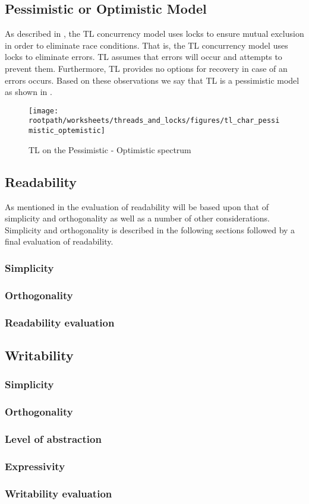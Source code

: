 \subsection{Pessimistic or Optimistic Model}
As described in , the \ac{TL} concurrency model uses locks to ensure mutual exclusion in order to eliminate race conditions. That is, the \ac{TL} concurrency model uses locks to eliminate errors. \ac{TL} assumes that errors will occur and attempts to prevent them. Furthermore, \ac{TL} provides no options for recovery in case of an errors occurs. Based on these observations we say that \ac{TL} is a pessimistic model as shown in .

\begin{figure}[htbp]
\centering
 \texttt{[image: \\rootpath/worksheets/threads\_and\_locks/figures/tl\_char\_pessimistic\_optemistic]} 
 \caption{\ac{TL} on the Pessimistic - Optimistic spectrum}
\label{fig:char_pes_opti}
\end{figure}

\subsection{Readability}
As mentioned in  the evaluation of readability will be based upon that of simplicity and orthogonality as well as a number of other considerations. Simplicity and orthogonality is described in the following sections followed by a final evaluation of readability.
\subsubsection{Simplicity}\label{subsec:tl_simplicity_read}
\subsubsection{Orthogonality}
\subsubsection{Readability evaluation}

\subsection{Writability}
\subsubsection{Simplicity}
\subsubsection{Orthogonality}
\subsubsection{Level of abstraction}
\subsubsection{Expressivity}
\subsubsection{Writability evaluation}
\worksheetend
